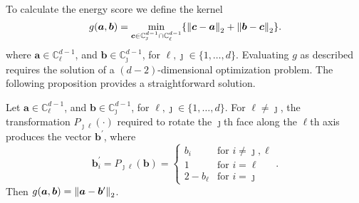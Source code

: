 To calculate the energy score we define the kernel 
    \[  
    g(\bm{a},\bm{b}) = \min_{\bm{c} \in{\mathbb C}_{\jmath}^{d-1}\cap{\mathbb C}_{\ell}^{d-1}}\left\{ 
        \pnorm{\bm{c}-\bm{a}}{2} + \pnorm{\bm{b}-\bm{c}}{2} \right\}.
    \]
    where $\bm{a} \in {\mathbb C}_{\ell}^{d-1}$, and 
    $\bm{b} \in {\mathbb   C}_{\jmath}^{d-1}$, for $\ell,\jmath\in \{1,\ldots, d\}$.
Evaluating $g$ as described requires the solution of a $(d-2)$-dimensional 
  optimization problem.  The following proposition provides a straightforward solution.
\begin{prop}\label{prop:rot}
    Let $\bm{a} \in {\mathbb C}_{\ell}^{d-1}$, and $\bm{b} \in {\mathbb C}_{\jmath}^{d-1}$, 
        for $\ell, \jmath \in \{1, \ldots , d\}$.  For $\ell\neq \jmath$, the 
  transformation $P_{\jmath\ell}(\cdot)$ required to rotate the $\jmath$th face along the 
  $\ell$th axis produces the vector $\bm{b}^\prime$, where
  \begin{equation}
    \label{eqn:rotation}
     \bm{b}^{\prime}_i = P_{\jmath\ell}(\bm{b}) = 
    \begin{cases}
        b_{i} &\text{for }i\neq \jmath,\ell\\
        1 &\text{for }i = \ell\\
        2 - b_{\ell} &\text{for }i = \jmath
    \end{cases}.
  \end{equation}
  Then $g(\bm{a},\bm{b}) = \pnorm{\bm{a} - \bm{b}^{\prime}}{2}$.
\end{prop}
